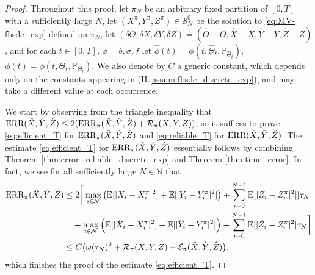 \documentclass[11pt]{article}
\numberwithin{equation}{section}
\theoremstyle{definition}
\theoremstyle{remark}
\def\ol{\overline} \def\cl{\centerline}   \def\ul{\underline}
\def\cE{\mathcal{E}}
\def\cN{\mathcal{N}}
\def\cR{\mathcal{R}}
\def\cS{\mathcal{S}}
\def\sE{{\mathbb{E}}}
\def\sN{{\mathbb{N}}}
\def\sP{\mathbb{P}}
\newcommand{\err}{\textnormal{ERR}}
\begin{document}
\begin{proof}
Throughout this proof, 
let $\pi_N$ be an arbitrary  fixed partition of $[0,T]$ 
with a sufficiently large $N$,
let $(X^\pi,Y^\pi, Z^\pi)\in \cS^0_N$
be the solution to  \eqref{eq:MV-fbsde_exp} defined on $\pi_N$,
let  $(\delta \Theta, \delta X,\delta Y, \delta Z)= ( \hat{ \Theta}-\Theta, \hat{X}-X, \hat{Y}-Y, \hat{Z}-Z)$,
and for each $t\in [0,T]$, $\phi=b, \sigma, f$
let $ \hat{\phi}(t)= \phi(t, \hat{\Theta}_t,\sP_{\hat{\Theta}_t})$,
$\phi(t)=\phi(t, \Theta_t,\sP_{\Theta_t})$.
We also denote by $C$ a generic constant, 
which
depends only on the constants appearing in (H.\ref{assum:fbsde_discrete_exp}),
and  may take a different value at each occurrence.

We start by observing from the triangle inequality  that
$\err(\hat{X},\hat{Y},\hat{Z})\le 2(\err_\pi(\hat{X},\hat{Y},\hat{Z})+\cR_\pi(X,Y,Z))$,
so it suffices to prove \eqref{eq:efficient_T} for $\err_\pi(\hat{X},\hat{Y},\hat{Z})$ 
and \eqref{eq:reliable_T} for $\err(\hat{X},\hat{Y},\hat{Z})$.
The estimate \eqref{eq:efficient_T} for $\err_\pi(\hat{X},\hat{Y},\hat{Z})$  essentially follows by combining 
 Theorem \ref{thm:error_reliable_discrete_exp}
and Theorem \ref{thm:time_error}.
In fact, 
we see for all  sufficiently large $N\in \sN$ that
\begin{align*}
\err_\pi(\hat{X},\hat{Y},\hat{Z})
&\le 
2\bigg[
\max_{i\in \cN}\left(
\sE[|
X_i
-{X}^\pi_{i}|^2]
+
\sE[|
{Y}_i
-{Y}^\pi_{i}|^2]
\right)
+
\sum_{i=0}^{N-1}
\sE[
|\bar{Z}_{i}
-{Z}^\pi_{i}|^2
]
]\tau_N
\\
&\quad +
\max_{i\in \cN}
\left(
\sE[|\hat{X}_{i}
-{X}^\pi_{i}|^2]
+
\sE[|\hat{Y}_{i}
-{Y}^\pi_{i}|^2]
\right)
+
\sum_{i=0}^{N-1}
\sE
[
|\hat{Z}_{i}
-{Z}^\pi_{i}|^2]\tau_N
\bigg]
\\
&
\le
C\big(\ol{\om}(\tau_N)^2
+
\cR_\pi(X,Y,Z)
+\cE_\pi(\hat{X},\hat{Y},\hat{Z})
\big),
\end{align*}
which finishes the proof of the estimate \eqref{eq:efficient_T}.


\end{proof}
\end{document}
